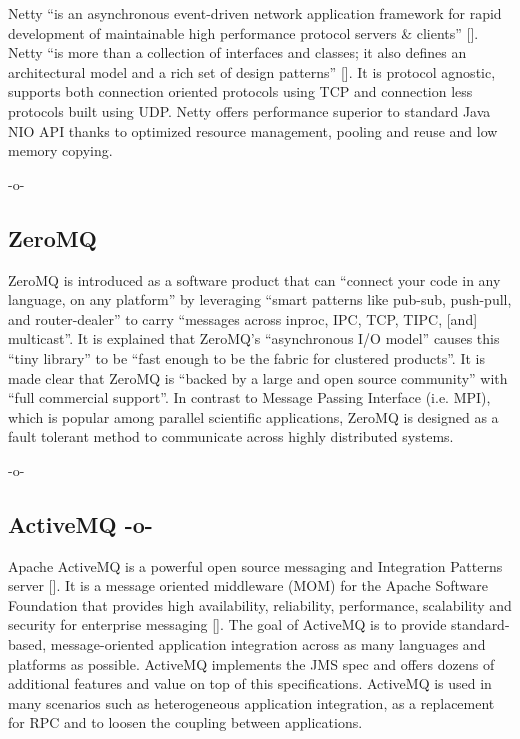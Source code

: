 Netty ``is an asynchronous event-driven network application framework
for rapid development of maintainable high performance protocol
servers \& clients'' [\cite{www-netty}]. Netty ``is more than a
collection of interfaces and classes; it also defines an architectural
model and a rich set of design patterns'' [\cite{netty-book}]. It is
protocol agnostic, supports both connection oriented protocols using
TCP and connection less protocols built using UDP. Netty offers
performance superior to standard Java NIO API thanks to optimized
resource management, pooling and reuse and low memory copying.

     -o-
     
\subsection{ZeroMQ}

     ZeroMQ is introduced as a software product
     that can ``connect your code in any language, on any platform'' by 
     leveraging ``smart patterns like pub-sub, push-pull, and 
     router-dealer'' to carry ``messages across inproc, IPC, TCP, TIPC, 
     [and] multicast''\cite{www-zeromq}. It is explained that
     ZeroMQ's ``asynchronous I/O model'' causes this ``tiny library'' to 
     be ``fast enough to be the fabric for clustered products''\cite{www-zeromq2}.
     It is made clear that ZeroMQ is ``backed by a
     large and open source community'' with ``full commercial
     support''\cite{www-zeromq}.
     In contrast to Message Passing Interface (i.e. MPI), which is 
     popular among parallel scientific applications, ZeroMQ is 
     designed as a fault tolerant method to communicate across highly 
     distributed systems.

     -o-

\subsection{ActiveMQ -o-}

Apache ActiveMQ is a powerful open source messaging and Integration
Patterns server [\cite{www-activeMQ}]. It is a message oriented
middleware (MOM) for the Apache Software Foundation that provides high
availability, reliability, performance, scalability and security for
enterprise messaging [\cite{ActiveMQ-book}]. The goal of ActiveMQ is to
provide standard-based, message-oriented application integration
across as many languages and platforms as possible. ActiveMQ
implements the JMS spec and offers dozens of additional features and
value on top of this specifications. ActiveMQ is used in many
scenarios such as heterogeneous application integration, as a
replacement for RPC and to loosen the coupling between applications.
     
